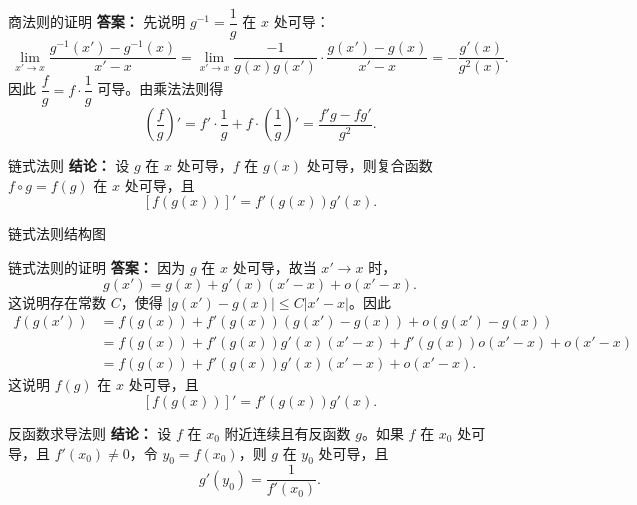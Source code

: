 ﻿\documentclass[aspectratio=169,11pt]{ctexbeamer}
\begin{document}
\begin{frame}{商法则的证明}
\small
\textbf{答案：} 先说明 $g^{-1}=\dfrac{1}{g}$ 在 $x$ 处可导：
\[
\lim_{x'\to x}\frac{g^{-1}(x')-g^{-1}(x)}{x'-x}
=\lim_{x'\to x}\frac{-1}{g(x)g(x')}\cdot\frac{g(x')-g(x)}{x'-x}
=-\frac{g'(x)}{g^2(x)}.
\]
因此 $\dfrac{f}{g}=f\cdot \dfrac{1}{g}$ 可导。由乘法法则得
\[
\left(\frac{f}{g}\right)'
=f'\cdot \frac{1}{g}+f\cdot \left(\frac{1}{g}\right)'
=\frac{f'g-fg'}{g^2}.
\]
\end{frame}

\begin{frame}{链式法则}
\small
\textbf{结论：} 设 $g$ 在 $x$ 处可导，$f$ 在 $g(x)$ 处可导，则复合函数 $f\circ g=f(g)$ 在 $x$ 处可导，且
\[
[f(g(x))]'=f'(g(x))g'(x).
\]
\end{frame}

\begin{frame}{链式法则结构图}
\begin{center}
\end{center}
\end{frame}

\begin{frame}{链式法则的证明}
\small
\textbf{答案：} 因为 $g$ 在 $x$ 处可导，故当 $x'\to x$ 时，
\[
g(x')=g(x)+g'(x)(x'-x)+o(x'-x).
\]
这说明存在常数 $C$，使得 $|g(x')-g(x)|\le C|x'-x|$。因此
\begin{align*}
f(g(x'))
&=f(g(x))+f'(g(x))(g(x')-g(x))+o(g(x')-g(x))\\
&=f(g(x))+f'(g(x))g'(x)(x'-x)+f'(g(x))o(x'-x)+o(x'-x)\\
&=f(g(x))+f'(g(x))g'(x)(x'-x)+o(x'-x).
\end{align*}
这说明 $f(g)$ 在 $x$ 处可导，且
\[
[f(g(x))]'=f'(g(x))g'(x).
\]
\end{frame}

\begin{frame}{反函数求导法则}
\small
\textbf{结论：} 设 $f$ 在 $x_0$ 附近连续且有反函数 $g$。如果 $f$ 在 $x_0$ 处可导，且 $f'(x_0)\neq 0$，令 $y_0=f(x_0)$，则 $g$ 在 $y_0$ 处可导，且
\[
g'(y_0)=\frac{1}{f'(x_0)}.
\]
\end{frame}
\end{document}
